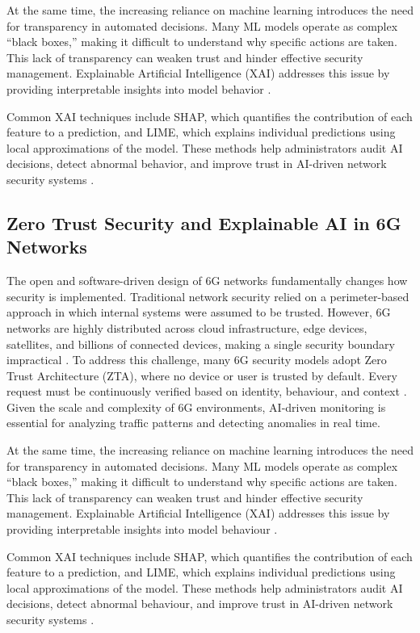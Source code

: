 \documentclass[letterpaper]{article} %
\begin{document}
At the same time, the increasing reliance on machine learning introduces the need for transparency in automated decisions. Many ML models operate as complex ``black boxes,'' making it difficult to understand why specific actions are taken. This lack of transparency can weaken trust and hinder effective security management. Explainable Artificial Intelligence (XAI) addresses this issue by providing interpretable insights into model behavior \cite{kaur2025}.

Common XAI techniques include SHAP, which quantifies the contribution of each feature to a prediction, and LIME, which explains individual predictions using local approximations of the model. These methods help administrators audit AI decisions, detect abnormal behavior, and improve trust in AI-driven network security systems \cite{kaur2025}.


\subsection{Zero Trust Security and Explainable AI in 6G Networks}

The open and software-driven design of 6G networks fundamentally changes how security is implemented. Traditional network security relied on a perimeter-based approach in which internal systems were assumed to be trusted. However, 6G networks are highly distributed across cloud infrastructure, edge devices, satellites, and billions of connected devices, making a single security boundary impractical \cite{kaur2025} .
To address this challenge, many 6G security models adopt Zero Trust Architecture (ZTA), where no device or user is trusted by default. Every request must be continuously verified based on identity, behaviour, and context \cite{kaur2025} . Given the scale and complexity of 6G environments, AI-driven monitoring is essential for analyzing traffic patterns and detecting anomalies in real time.

At the same time, the increasing reliance on machine learning introduces the need for transparency in automated decisions. Many ML models operate as complex “black boxes,” making it difficult to understand why specific actions are taken. This lack of transparency can weaken trust and hinder effective security management. Explainable Artificial Intelligence (XAI) addresses this issue by providing interpretable insights into model behaviour \cite{kaur2025} .

Common XAI techniques include SHAP, which quantifies the contribution of each feature to a prediction, and LIME, which explains individual predictions using local approximations of the model. These methods help administrators audit AI decisions, detect abnormal behaviour, and improve trust in AI-driven network security systems \cite{kaur2025}.
\end{document}
